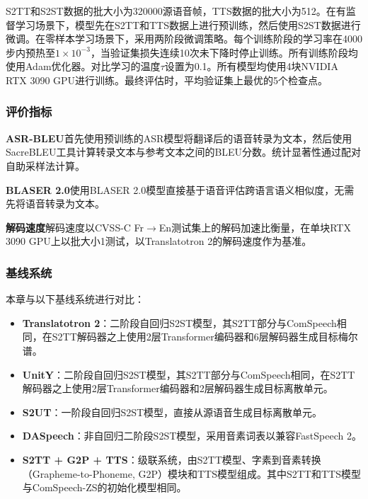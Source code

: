 S2TT和S2ST数据的批大小为320000源语音帧，TTS数据的批大小为512。在有监督学习场景下，模型先在S2TT和TTS数据上进行预训练，然后使用S2ST数据进行微调。在零样本学习场景下，采用两阶段微调策略。每个训练阶段的学习率在4000步内预热至$1\times 10^{-3}$，当验证集损失连续10次未下降时停止训练。所有训练阶段均使用Adam优化器\citep{adam}。对比学习的温度$\tau$设置为0.1。所有模型均使用4块NVIDIA RTX 3090 GPU进行训练。最终评估时，平均验证集上最优的5个检查点。

\subsubsection{评价指标}

\textbf{ASR-BLEU}\quad 首先使用预训练的ASR模型将翻译后的语音转录为文本，然后使用SacreBLEU\citep{post-2018-call}工具计算转录文本与参考文本之间的BLEU分数\citep{papineni-etal-2002-bleu}。统计显著性通过配对自助采样法计算。

\textbf{BLASER 2.0}\quad 使用BLASER 2.0模型\citep{communication2023seamlessm4t}直接基于语音评估跨语言语义相似度，无需先将语音转录为文本。

\textbf{解码速度}\quad 解码速度以CVSS-C Fr$\rightarrow$En测试集上的解码加速比衡量，在单块RTX 3090 GPU上以批大小1测试，以Translatotron 2的解码速度作为基准。

\subsubsection{基线系统}

本章与以下基线系统进行对比：

\begin{itemize}
    \item \textbf{Translatotron 2}\citep{translatotron2}：二阶段自回归S2ST模型，其S2TT部分与ComSpeech相同，在S2TT解码器之上使用2层Transformer编码器和6层解码器生成目标梅尔谱。
    \item \textbf{UnitY}\citep{inaguma-etal-2023-unity}：二阶段自回归S2ST模型，其S2TT部分与ComSpeech相同，在S2TT解码器之上使用2层Transformer编码器和2层解码器生成目标离散单元。
    \item \textbf{S2UT}\citep{s2ut}：一阶段自回归S2ST模型，直接从源语音生成目标离散单元。
    \item \textbf{DASpeech}\citep{fang2023daspeech}：非自回归二阶段S2ST模型，采用音素词表以兼容FastSpeech 2。
    \item \textbf{S2TT + G2P + TTS}：级联系统，由S2TT模型、字素到音素转换（Grapheme-to-Phoneme, G2P）模块和TTS模型组成。其中S2TT和TTS模型与ComSpeech-ZS的初始化模型相同。
\end{itemize}


